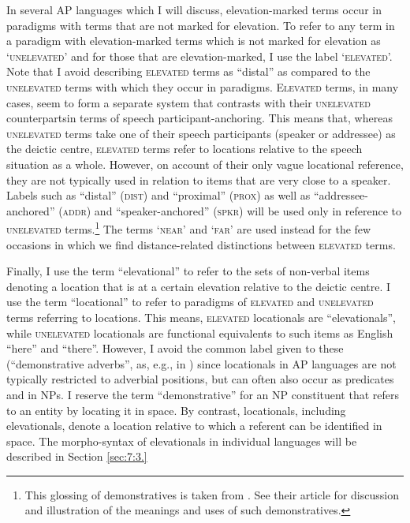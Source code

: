 In several AP languages which I will discuss, elevation-marked terms occur in paradigms with terms that are not marked for elevation. To refer to any term in a paradigm with elevation-marked terms which is not marked for elevation as `\textsc{unelevated}' and for those that are elevation-marked, I use the label `\textsc{elevated'.} Note that I avoid describing \textsc{elevated} terms as ``distal'' as compared to the \textsc{unelevated} terms with which they occur in paradigms. E\textsc{levated} terms, in many cases, seem to form a separate system that contrasts with their \textsc{unelevated} counterpartsin terms of speech participant-anchoring. This means that, whereas \textsc{unelevated} terms take one of their speech participants (speaker or addressee) as the deictic centre, \textsc{elevated} terms refer to locations relative to the speech situation as a whole. However, on account of their only vague locational reference, they are not typically used in relation to items that are very close to a speaker. Labels such as ``distal'' (\textsc{dist}) and ``proximal'' (\textsc{prox}) as well as ``addressee-anchored'' (\textsc{addr)} and ``speaker-anchored'' (\textsc{spkr)} will be used only in reference to \textsc{unelevated} terms.\footnote{{}  This glossing of demonstratives is taken from  \citet{SchapperEtAl2011}. See their article for discussion and illustration of the meanings and uses of such demonstratives.} The terms `\textsc{near}' and `\textsc{far'} are used instead for the few occasions in which we find distance-related distinctions between \textsc{elevated} terms.

Finally, I use the term ``elevational'' to refer to the sets of non-verbal items denoting a location that is at a certain elevation relative to the deictic centre. I use the term ``locational'' to refer to paradigms of \textsc{elevated} and \textsc{unelevated} terms referring to locations. This means, \textsc{elevated} locationals are ``elevationals'', while \textsc{unelevated} locationals are functional equivalents to such items as English ``here'' and ``there''. However, I avoid the common label given to these (``demonstrative adverbs'', as, e.g., in \citealt{Diessel1999}) since locationals in AP languages are not typically restricted to adverbial positions, but can often also occur as predicates and in NPs. I reserve the term ``demonstrative'' for an NP constituent that refers to an entity by locating it in space. By contrast, locationals, including elevationals, denote a location relative to which a referent can be identified in space. The morpho-syntax of elevationals in individual languages will be described in Section \ref{sec:7:3.}

